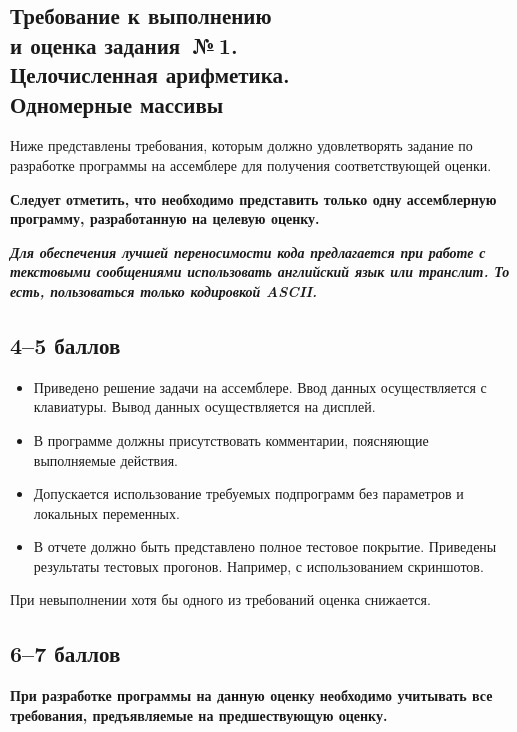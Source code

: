 \documentclass[a4paper, 12pt, oneside]{article}
\begin{document}
\begin{center}
\section*{Требование к выполнению \\ и оценка задания~№\,1. \\ Целочисленная арифметика. \\ Одномерные массивы}
\end{center}

Ниже представлены требования, которым должно удовлетворять задание по разработке программы на ассемблере для получения соответствующей оценки.

\textbf{Следует отметить, что необходимо представить только одну ассемблерную программу, разработанную на целевую оценку.}

\textbf{\textit{Для обеспечения лучшей переносимости кода предлагается при работе с текстовыми сообщениями использовать английский язык или транслит. То есть, пользоваться только кодировкой ASCII.}}

\subsection*{4--5 баллов}

\begin{itemize}
    \item Приведено решение задачи на ассемблере. Ввод данных осуществляется с клавиатуры. Вывод данных осуществляется на дисплей.
    \item В программе должны присутствовать комментарии, поясняющие выполняемые действия.
    \item Допускается использование требуемых подпрограмм без параметров и локальных переменных.
    \item В отчете должно быть представлено полное тестовое покрытие. Приведены результаты тестовых прогонов. Например, с использованием скриншотов.
\end{itemize}
При невыполнении хотя бы одного из требований оценка снижается.


\subsection*{6--7 баллов}

\textbf{При разработке программы на данную оценку необходимо учитывать все требования, предъявляемые на предшествующую оценку.}
\end{document}
